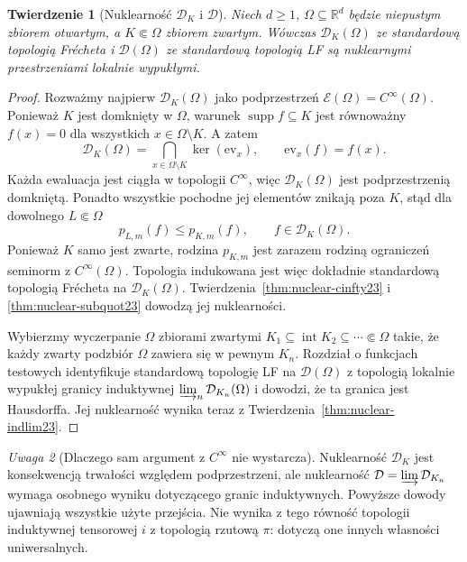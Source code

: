 \documentclass[11pt,a4paper]{article}
\numberwithin{equation}{section}
\theoremstyle{plain}
\newtheorem{twierdzenie}{Twierdzenie}[section]
\theoremstyle{definition}
\theoremstyle{remark}
\newtheorem{uwaga}[twierdzenie]{Uwaga}
\newcommand{\R}{\mathbb R}
\DeclareMathOperator{\supp}{supp}
\begin{document}
\begin{twierdzenie}[Nuklearność $\mathcal D_K$ i $\mathcal D$]
\label{thm:nuclear-D23}
Niech $d\ge1$, $\Omega\subseteq\R^d$ będzie niepustym
zbiorem otwartym, a $K\Subset\Omega$ zbiorem zwartym.
Wówczas $\mathcal D_K(\Omega)$ ze standardową topologią
Frécheta i $\mathcal D(\Omega)$ ze standardową topologią
LF są nuklearnymi przestrzeniami lokalnie wypukłymi.
\end{twierdzenie}
\begin{proof}
Rozważmy najpierw $\mathcal D_K(\Omega)$ jako
podprzestrzeń $\mathcal E(\Omega)=C^\infty(\Omega)$.
Ponieważ $K$ jest domknięty w $\Omega$,
warunek $\supp f\subseteq K$ jest równoważny
$f(x)=0$ dla wszystkich $x\in\Omega\setminus K$.
A zatem
\[
 \mathcal D_K(\Omega)=
 \bigcap_{x\in\Omega\setminus K}\ker(\mathrm{ev}_x),
 \qquad \mathrm{ev}_x(f)=f(x).
\]
Każda ewaluacja jest ciągła w topologii $C^\infty$,
więc $\mathcal D_K(\Omega)$ jest podprzestrzenią
domkniętą. Ponadto wszystkie pochodne jej elementów
znikają poza $K$, stąd dla dowolnego $L\Subset\Omega$
\[
 p_{L,m}(f)\le p_{K,m}(f),\qquad
 f\in\mathcal D_K(\Omega).
\]
Ponieważ $K$ samo jest zwarte, rodzina $p_{K,m}$
jest zarazem rodziną ograniczeń seminorm z $C^\infty(\Omega)$.
Topologia indukowana jest więc dokładnie standardową
topologią Frécheta na $\mathcal D_K(\Omega)$.
Twierdzenia~\ref{thm:nuclear-cinfty23} i
\ref{thm:nuclear-subquot23} dowodzą jej nuklearności.

Wybierzmy wyczerpanie $\Omega$ zbiorami zwartymi
$K_1\subseteq\operatorname{int}K_2\subseteq\cdots\Subset\Omega$
takie, że każdy zwarty podzbiór $\Omega$ zawiera się
w pewnym $K_n$. Rozdział o funkcjach testowych
identyfikuje standardową topologię LF na
$\mathcal D(\Omega)$ z topologią lokalnie wypukłej
granicy induktywnej $\varinjlim_n\mathcal D_{K_n}(\Omega)$
i dowodzi, że ta granica jest Hausdorffa.
Jej nuklearność wynika teraz z
Twierdzenia~\ref{thm:nuclear-indlim23}.
\end{proof}

\begin{uwaga}[Dlaczego sam argument z $C^\infty$ nie wystarcza]
\label{rem:nuclear-D-summary23}
Nuklearność $\mathcal D_K$ jest konsekwencją trwałości
względem podprzestrzeni, ale nuklearność
$\mathcal D=\varinjlim\mathcal D_{K_n}$ wymaga osobnego
wyniku dotyczącego granic induktywnych. Powyższe dowody
ujawniają wszystkie użyte przejścia. Nie wynika z tego
równość topologii induktywnej tensorowej $i$ z topologią
rzutową $\pi$: dotyczą one innych własności uniwersalnych.
\end{uwaga}
\end{document}
